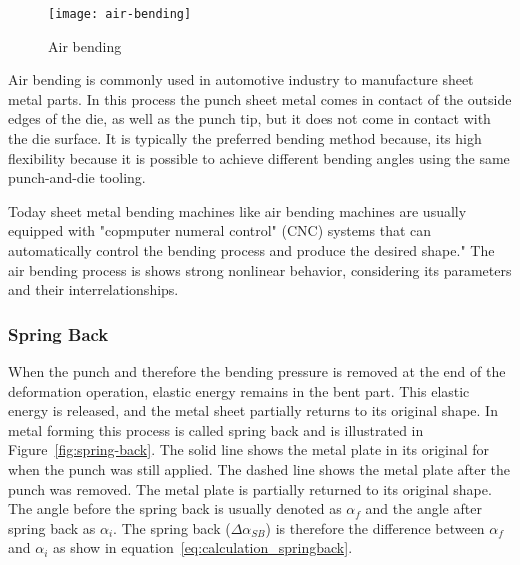 \begin{figure}[H]
    \centering
    \texttt{[image: air-bending]}
    \caption{Air bending \cite[p. 416]{groover_fundamentalsmodernmanufacturing_2020}}
    \label{fig:air-bending}
\end{figure}

Air bending is commonly used in automotive industry to manufacture sheet metal parts. \cite[p. 342]{kim_predictionbendallowance_2007}
In this process the punch sheet metal comes in contact of the outside edges of the die, as well as the punch tip, but it does not come in contact with the die surface. 
It is typically the preferred bending method because, its high flexibility because it is possible to achieve different bending angles using the same punch-and-die tooling.
\cite[p. 3]{miranda_formingspringbackprediction_2018}\cite[p. 1]{cruz_applicationmachinelearning_2021} 

Today sheet metal bending machines like air bending machines are usually equipped with "copmputer numeral control" (CNC) systems that can automatically control the bending process and produce the desired shape." \cite[p. 3]{miranda_formingspringbackprediction_2018}
The air bending process is shows strong nonlinear behavior, considering its parameters and their interrelationships. \cite[p. 3]{miranda_formingspringbackprediction_2018}

\subsubsection{Spring Back} 
When the punch and therefore the bending pressure is removed at the end of the deformation operation, elastic energy remains in the bent part. This elastic energy is released, and the metal sheet partially returns to its original shape. \cite[p. 113-114]{groover_fundamentalsmodernmanufacturing_2020} In metal forming this process is called spring back and is illustrated in Figure~\ref{fig:spring-back}. 
The solid line shows the metal plate in its original for when the punch was still applied. The dashed line shows the metal plate after the punch was removed. The metal plate is partially returned to its original shape. The angle before the spring back is usually denoted as $\alpha_f$ and the angle after spring back as $\alpha_i$. 
The spring back ($\Delta \alpha_{SB}$) is therefore the difference between $\alpha_f$ and $\alpha_i$ as show in equation~\ref*{eq:calculation_springback}. \cite[p. 6]{cruz_applicationmachinelearning_2021}

